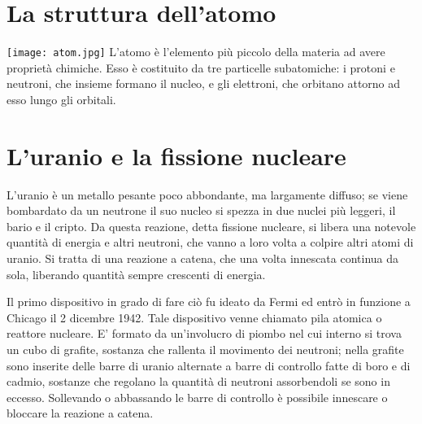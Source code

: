 \section{La struttura dell'atomo}
\texttt{[image: atom.jpg]}
L'atomo  è l'elemento più piccolo della materia ad avere proprietà chimiche. Esso è costituito da tre particelle subatomiche: i protoni e neutroni, che insieme formano il nucleo, e gli elettroni, che orbitano attorno ad esso lungo gli orbitali.

\section{L'uranio e la fissione nucleare}
L'uranio è un metallo pesante poco abbondante, ma largamente diffuso; se viene bombardato da un neutrone il suo nucleo si spezza in due nuclei più leggeri, il bario e il cripto. Da questa reazione, detta fissione nucleare, si libera una notevole quantità di energia e altri neutroni, che vanno a loro volta a colpire altri atomi di uranio. Si tratta di una reazione a catena, che una volta innescata continua da sola, liberando quantità sempre crescenti di energia.

Il primo dispositivo in grado di fare ciò fu ideato da Fermi ed entrò in funzione a Chicago il 2 dicembre 1942. Tale dispositivo venne chiamato pila atomica o reattore nucleare. E' formato da un'involucro di piombo nel cui interno si trova un cubo di grafite, sostanza che rallenta il movimento dei neutroni; nella grafite sono inserite delle barre di uranio alternate a barre di controllo fatte di boro e di cadmio, sostanze che regolano la quantità di neutroni assorbendoli se sono in eccesso. Sollevando o abbassando le barre di controllo è possibile innescare o bloccare la reazione a catena.
